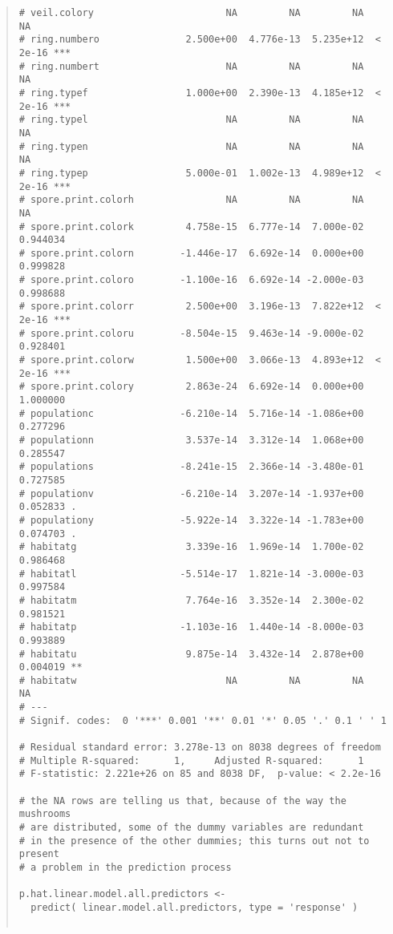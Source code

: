 \documentclass[12pt]{article}
\begin{document}
\begin{quote}
\begin{verbatim}
# veil.colory                       NA         NA         NA       NA    
# ring.numbero               2.500e+00  4.776e-13  5.235e+12  < 2e-16 ***
# ring.numbert                      NA         NA         NA       NA    
# ring.typef                 1.000e+00  2.390e-13  4.185e+12  < 2e-16 ***
# ring.typel                        NA         NA         NA       NA    
# ring.typen                        NA         NA         NA       NA    
# ring.typep                 5.000e-01  1.002e-13  4.989e+12  < 2e-16 ***
# spore.print.colorh                NA         NA         NA       NA    
# spore.print.colork         4.758e-15  6.777e-14  7.000e-02 0.944034    
# spore.print.colorn        -1.446e-17  6.692e-14  0.000e+00 0.999828    
# spore.print.coloro        -1.100e-16  6.692e-14 -2.000e-03 0.998688    
# spore.print.colorr         2.500e+00  3.196e-13  7.822e+12  < 2e-16 ***
# spore.print.coloru        -8.504e-15  9.463e-14 -9.000e-02 0.928401    
# spore.print.colorw         1.500e+00  3.066e-13  4.893e+12  < 2e-16 ***
# spore.print.colory         2.863e-24  6.692e-14  0.000e+00 1.000000    
# populationc               -6.210e-14  5.716e-14 -1.086e+00 0.277296    
# populationn                3.537e-14  3.312e-14  1.068e+00 0.285547    
# populations               -8.241e-15  2.366e-14 -3.480e-01 0.727585    
# populationv               -6.210e-14  3.207e-14 -1.937e+00 0.052833 .  
# populationy               -5.922e-14  3.322e-14 -1.783e+00 0.074703 .  
# habitatg                   3.339e-16  1.969e-14  1.700e-02 0.986468    
# habitatl                  -5.514e-17  1.821e-14 -3.000e-03 0.997584    
# habitatm                   7.764e-16  3.352e-14  2.300e-02 0.981521    
# habitatp                  -1.103e-16  1.440e-14 -8.000e-03 0.993889    
# habitatu                   9.875e-14  3.432e-14  2.878e+00 0.004019 ** 
# habitatw                          NA         NA         NA       NA    
# ---
# Signif. codes:  0 '***' 0.001 '**' 0.01 '*' 0.05 '.' 0.1 ' ' 1

# Residual standard error: 3.278e-13 on 8038 degrees of freedom
# Multiple R-squared:      1,     Adjusted R-squared:      1 
# F-statistic: 2.221e+26 on 85 and 8038 DF,  p-value: < 2.2e-16

# the NA rows are telling us that, because of the way the mushrooms
# are distributed, some of the dummy variables are redundant
# in the presence of the other dummies; this turns out not to present
# a problem in the prediction process

p.hat.linear.model.all.predictors <- 
  predict( linear.model.all.predictors, type = 'response' )


\end{verbatim}
\end{quote}
\end{document}

